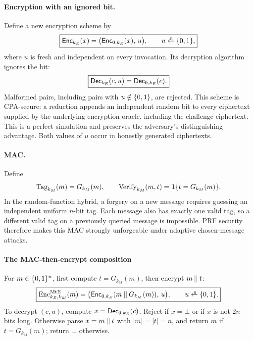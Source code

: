 \paragraph{Encryption with an ignored bit.} Define a new encryption scheme by
\begin{equation}
  \boxed{
  \Enc_{k_E}(x)=\bigl(\Enc_{0,k_E}(x),\,u\bigr),
  \qquad u\getsr\bits,
  }
  \label{eq:redundant-encryption}
\end{equation}
where $u$ is fresh and independent on every invocation. Its decryption
algorithm ignores the bit:
\begin{equation}
  \boxed{\mathsf{Dec}_{k_E}(c,u)=\mathsf{Dec}_{0,k_E}(c).}
  \label{eq:ignored-bit}
\end{equation}
Malformed pairs, including pairs with $u\notin\{0,1\}$, are rejected.
This scheme is CPA-secure: a reduction appends an independent random bit to
every ciphertext supplied by the underlying encryption oracle, including
the challenge ciphertext. This is a perfect simulation and preserves the
adversary's distinguishing advantage. Both values of $u$ occur in honestly
generated ciphertexts.

\paragraph{MAC.} Define
\[
  \operatorname{Tag}_{k_M}(m)=G_{k_M}(m),
  \qquad
  \operatorname{Verify}_{k_M}(m,t)=\mathbf{1}\{t=G_{k_M}(m)\}.
\]
In the random-function hybrid, a forgery on a new message requires guessing
an independent uniform $n$-bit tag. Each message also has exactly one valid
tag, so a different valid tag on a previously queried message is impossible.
PRF security therefore makes this MAC strongly unforgeable under adaptive
chosen-message attacks.

\paragraph{The MAC-then-encrypt composition}

For $m\in\{0,1\}^n$, first compute $t=G_{k_M}(m)$, then encrypt $m\mathbin{||} t$:
\begin{equation}
  \boxed{
  \EncME_{k_E,k_M}(m)
    =\bigl(\Enc_{0,k_E}(m\concat G_{k_M}(m)),\,u\bigr),
  \qquad u\getsr\bits.
  }
  \label{eq:composition}
\end{equation}
To decrypt $(c,u)$, compute $x=\mathsf{Dec}_{0,k_E}(c)$. Reject if $x=\bot$ or if
$x$ is not $2n$ bits long. Otherwise parse $x=m\mathbin{||} t$ with
$|m|=|t|=n$, and return $m$ if $t=G_{k_M}(m)$; return $\bot$ otherwise.

